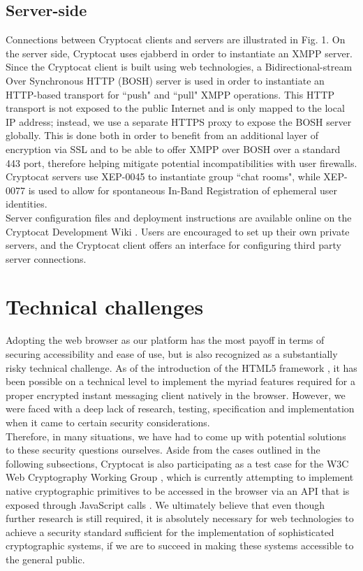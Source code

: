 \documentclass[letterpaper,twocolumn,10pt]{article}
\begin{document}
\subsection{Server-side}

Connections between Cryptocat clients and servers are illustrated in Fig. 1. On the server side, Cryptocat uses ejabberd \cite{ejabberd} in order to instantiate an XMPP server. Since the Cryptocat client is built using web technologies, a Bidirectional-stream Over Synchronous HTTP (BOSH) \cite{bosh} server is used in order to instantiate an HTTP-based transport for ``push" and ``pull" XMPP operations. This HTTP transport is not exposed to the public Internet and is only mapped to the local IP address; instead, we use a separate HTTPS proxy to expose the BOSH server globally. This is done both in order to benefit from an additional layer of encryption via SSL and to be able to offer XMPP over BOSH over a standard 443 port, therefore helping mitigate potential incompatibilities with user firewalls. \\
Cryptocat servers use XEP-0045 \cite{xep-0045} to instantiate group ``chat rooms", while XEP-0077 \cite{xep-0077} is used to allow for spontaneous In-Band Registration of ephemeral user identities. \\
Server configuration files and deployment instructions are available online on the Cryptocat Development Wiki \cite{server-instructions}. Users are encouraged to set up their own private servers, and the Cryptocat client offers an interface for configuring third party server connections.

\section{Technical challenges}

Adopting the web browser as our platform has the most payoff in terms of securing accessibility and ease of use, but is also recognized as a substantially risky technical challenge. As of the introduction of the HTML5 framework \cite{html5}, it has been possible on a technical level to implement the myriad features required for a proper encrypted instant messaging client natively in the browser. However, we were faced with a deep lack of research, testing, specification and implementation when it came to certain security considerations. \\ Therefore, in many situations, we have had to come up with potential solutions to these security questions ourselves. Aside from the cases outlined in the following subsections, Cryptocat is also participating as a test case for the W3C Web Cryptography Working Group \cite{webcrypto-group}, which is currently attempting to implement native cryptographic primitives to be accessed in the browser via an API that is exposed through JavaScript calls \cite{webcrypto-spec}. We ultimately believe that even though further research is still required, it is absolutely necessary for web technologies to achieve a security standard sufficient for the implementation of sophisticated cryptographic systems, if we are to succeed in making these systems accessible to the general public.
\end{document}
